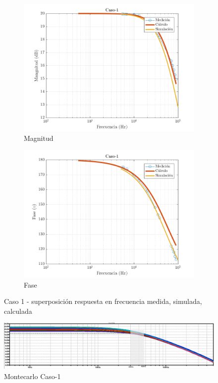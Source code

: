 \documentclass[../../main.tex]{subfiles}
\begin{document}
\begin{figure}[H]
\centering
\begin{subfigure}[http]{0.49\textwidth}
\includegraphics[width=\textwidth]{imagenes/Caso-1_mag_inv.png}
\caption{Magnitud}\label{fig=magInvC1}
\end{subfigure}
\begin{subfigure}[http]{0.49\textwidth}
\includegraphics[width=\textwidth]{imagenes/Caso-1_fase_inv.png}
\caption{Fase}
\end{subfigure}
\caption{Caso 1 - superposición respuesta en  frecuencia medida, simulada, calculada}
\end{figure}

\begin{figure}[H]
\centering
\includegraphics[width=1\textwidth]{imagenes/montecarlo_inv_c1.png}
\caption{Montecarlo Caso-1} \label{fig=mcInvC1}
\end{figure}
\end{document}
